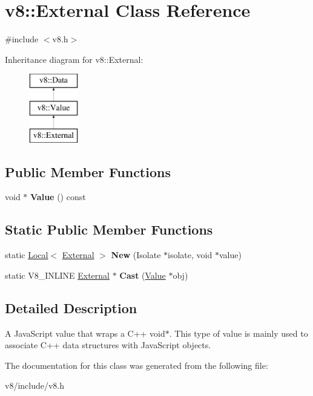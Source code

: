 \hypertarget{classv8_1_1External}{}\section{v8\+:\+:External Class Reference}
\label{classv8_1_1External}


{\ttfamily \#include $<$v8.\+h$>$}

Inheritance diagram for v8\+:\+:External\+:\begin{figure}[H]
\begin{center}
\leavevmode
\includegraphics[height=3.000000cm]{classv8_1_1External}
\end{center}
\end{figure}
\subsection*{Public Member Functions}
\begin{DoxyCompactItemize}
\item 
\mbox{\label{classv8_1_1External_a5d5f967787189f6e2e35c51836862777}} 
void $\ast$ {\bfseries Value} () const
\end{DoxyCompactItemize}
\subsection*{Static Public Member Functions}
\begin{DoxyCompactItemize}
\item 
\mbox{\label{classv8_1_1External_a1e877f692e95f13ac3102707ce8cbab9}} 
static \mbox{\hyperlink{classv8_1_1Local}{Local}}$<$ \mbox{\hyperlink{classv8_1_1External}{External}} $>$ {\bfseries New} (Isolate $\ast$isolate, void $\ast$value)
\item 
\mbox{\label{classv8_1_1External_a4711aba26710c5dd72f11cb81808f9c2}} 
static V8\+\_\+\+I\+N\+L\+I\+NE \mbox{\hyperlink{classv8_1_1External}{External}} $\ast$ {\bfseries Cast} (\mbox{\hyperlink{classv8_1_1Value}{Value}} $\ast$obj)
\end{DoxyCompactItemize}


\subsection{Detailed Description}
A Java\+Script value that wraps a C++ void$\ast$. This type of value is mainly used to associate C++ data structures with Java\+Script objects. 

The documentation for this class was generated from the following file\+:\begin{DoxyCompactItemize}
\item 
v8/include/v8.\+h\end{DoxyCompactItemize}
